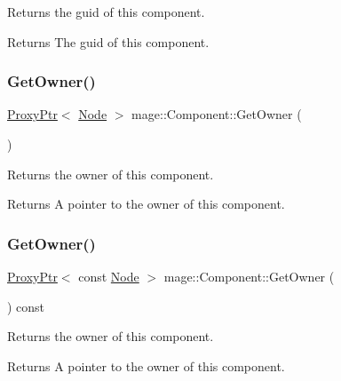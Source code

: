 Returns the guid of this component.

\begin{DoxyReturn}{Returns}
The guid of this component. 
\end{DoxyReturn}
\hypertarget{classmage_1_1_component_af6261b2a7688dd5a078a917e1ec69e0b}{}\label{classmage_1_1_component_af6261b2a7688dd5a078a917e1ec69e0b} 
\subsubsection{\texorpdfstring{Get\+Owner()}{GetOwner()}\hspace{0.1cm}{\footnotesize\ttfamily [1/2]}}
{\footnotesize\ttfamily \hyperlink{classmage_1_1_proxy_ptr}{Proxy\+Ptr}$<$ \hyperlink{classmage_1_1_node}{Node} $>$ mage\+::\+Component\+::\+Get\+Owner (\begin{DoxyParamCaption}{ }\end{DoxyParamCaption})\hspace{0.3cm}{\ttfamily [noexcept]}}

Returns the owner of this component.

\begin{DoxyReturn}{Returns}
A pointer to the owner of this component. 
\end{DoxyReturn}
\hypertarget{classmage_1_1_component_a97f402d0f75eff5a893abd2821a5335d}{}\label{classmage_1_1_component_a97f402d0f75eff5a893abd2821a5335d} 
\subsubsection{\texorpdfstring{Get\+Owner()}{GetOwner()}\hspace{0.1cm}{\footnotesize\ttfamily [2/2]}}
{\footnotesize\ttfamily \hyperlink{classmage_1_1_proxy_ptr}{Proxy\+Ptr}$<$ const \hyperlink{classmage_1_1_node}{Node} $>$ mage\+::\+Component\+::\+Get\+Owner (\begin{DoxyParamCaption}{ }\end{DoxyParamCaption}) const\hspace{0.3cm}{\ttfamily [noexcept]}}

Returns the owner of this component.

\begin{DoxyReturn}{Returns}
A pointer to the owner of this component. 
\end{DoxyReturn}
\hypertarget{classmage_1_1_component_a56f63648ba479decbba4a6fbaa544b4d}{}\label{classmage_1_1_component_a56f63648ba479decbba4a6fbaa544b4d} 
